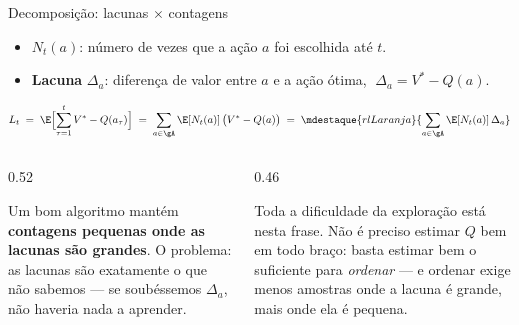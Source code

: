 \documentclass[aspectratio=169, 10pt]{beamer}
\newcommand{\Nc}{N}                         %
\newcommand{\gap}{\Delta}
\newcommand{\Reg}{L}
\begin{document}
\begin{frame}{Decomposição: lacunas $\times$ contagens}
  \begin{itemize}
    \item $\Nc_t(a)$: número de vezes que a ação $a$ foi escolhida até $t$.
    \item \textbf{Lacuna} $\gap_a$: diferença de valor entre $a$ e a ação
          ótima, $\;\gap_a = V^{*} - Q(a)$.
  \end{itemize}

  \[
    \Reg_t \;=\; \E\Bigl[\sum_{\tau=1}^{t} V^{*} - Q(a_\tau)\Bigr]
      \;=\; \sum_{a \in \gA} \E[\Nc_t(a)]\,\bigl(V^{*} - Q(a)\bigr)
      \;=\; \mdestaque{rlLaranja}{\sum_{a \in \gA} \E[\Nc_t(a)]\,\gap_a}
  \]

  \begin{columns}[T]
    \begin{column}{0.52\textwidth}
      \begin{ideiabox}
        Um bom algoritmo mantém \textbf{contagens pequenas onde as lacunas
        são grandes}. O problema: as lacunas são exatamente o que não
        sabemos --- se soubéssemos $\gap_a$, não haveria nada a aprender.
      \end{ideiabox}
    \end{column}
    \begin{column}{0.46\textwidth}
      \begin{alertabox}
        Toda a dificuldade da exploração está nesta frase. Não é preciso
        estimar $Q$ bem em todo braço: basta estimar bem o suficiente para
        \emph{ordenar} --- e ordenar exige menos amostras onde a lacuna é
        grande, mais onde ela é pequena.
      \end{alertabox}
    \end{column}
  \end{columns}
\end{frame}
\end{document}
